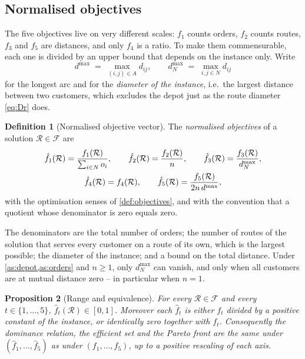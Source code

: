 \documentclass[11pt,a4paper]{article}
\theoremstyle{definition}
\newtheorem{definition}{Definition}[section]
\theoremstyle{plain}
\newtheorem{proposition}[definition]{Proposition}
\newcommand{\Feas}{\mathcal{F}}
\newcommand{\Routes}{\mathcal{R}}
\newcommand{\Arcs}{A}
\newcommand{\Cust}{N}
\begin{document}
\subsection{Normalised objectives}
\label{sec:normalised}

The five objectives live on very different scales: $f_1$ counts orders, $f_2$
counts routes, $f_3$ and $f_5$ are distances, and only $f_4$ is a ratio.  To
make them commensurable, each one is divided by an upper bound that depends on
the instance only.  Write
\begin{equation}
  d^{\max} \;=\; \max_{(i,j) \in \Arcs} d_{ij},
  \qquad
  d^{\max}_{\Cust} \;=\; \max_{i,j \in \Cust} d_{ij}
  \label{eq:dmax}
\end{equation}
for the longest arc and for the \emph{diameter of the instance}, i.e.\ the
largest distance between two customers, which excludes the depot just as the
route diameter \eqref{eq:Dr} does.

\begin{definition}[Normalised objective vector]
\label{def:normalised}
The \emph{normalised objectives} of a solution $\Routes \in \Feas$ are
\begin{gather}
  \hat f_1(\Routes) = \frac{f_1(\Routes)}{\sum_{i \in \Cust} o_i}, \qquad
  \hat f_2(\Routes) = \frac{f_2(\Routes)}{n}, \qquad
  \hat f_3(\Routes) = \frac{f_3(\Routes)}{d^{\max}_{\Cust}}, \notag\\
  \hat f_4(\Routes) = f_4(\Routes), \qquad
  \hat f_5(\Routes) = \frac{f_5(\Routes)}{2n\,d^{\max}},
  \label{eq:normalised}
\end{gather}
with the optimisation senses of \cref{def:objectives}, and with the convention
that a quotient whose denominator is zero equals zero.
\end{definition}

The denominators are the total number of orders; the number of routes of the
solution that serves every customer on a route of its own, which is the largest
possible; the diameter of the instance; and a bound on the total distance.
Under \cref{as:depot,as:orders} and $n \ge 1$, only $d^{\max}_{\Cust}$ can
vanish, and only when all customers are at mutual distance zero -- in
particular when $n = 1$.

\begin{proposition}[Range and equivalence]
\label{prop:normalised}
For every $\Routes \in \Feas$ and every $t \in \{1,\dots,5\}$,
$\hat f_t(\Routes) \in [0,1]$.  Moreover each $\hat f_t$ is either $f_t$
divided by a positive constant of the instance, or identically zero together
with $f_t$.  Consequently the dominance relation, the efficient set and the
Pareto front are the same under $(\hat f_1,\dots,\hat f_5)$ as under
$(f_1,\dots,f_5)$, up to a positive rescaling of each axis.
\end{proposition}
\end{document}
